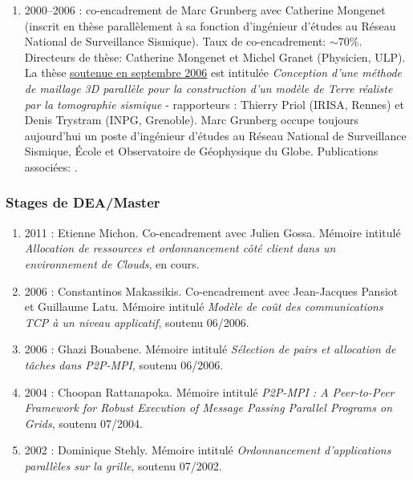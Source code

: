 \documentclass[11pt]{article}
\begin{document}
\begin{enumerate}
\item 2000--2006 : co-encadrement de Marc Grunberg avec Catherine Mongenet 
(inscrit en thèse parallèlement à sa fonction d'ingénieur d'études au Réseau 
National de Surveillance Sismique). Taux de co-encadrement: $\sim$70\%.
Directeurs de thèse: Catherine Mongenet et Michel Granet (Physicien, ULP).
La thèse \underline{soutenue en septembre 2006} est intitulée \textit{Conception 
d'une méthode de maillage 3D parallèle pour la construction d'un modèle de Terre 
réaliste par la tomographie sismique} - rapporteurs : Thierry Priol (IRISA, Rennes) 
et Denis Trystram (INPG, Grenoble).
Marc Grunberg occupe toujours aujourd'hui un poste d'ingénieur d'études au Réseau 
National de Surveillance Sismique, \'{E}cole et Observatoire de Géophysique du Globe.
Publications associées: 
\cite{icps-2002-20,icps-2003-111,icps-2003-113,
      icps-2004-107,icps-2004-124,icps-2005-146,icps-2007-184}.\\



\end{enumerate}

\subsubsection{Stages de DEA/Master}
\begin{enumerate}

\item 2011 : Etienne Michon. Co-encadrement avec Julien Gossa. Mémoire intitulé  \textit{Allocation de ressources et ordonnancement côté client dans un environnement de Clouds}, en cours.
\item 2006 : Constantinos Makassikis. Co-encadrement avec Jean-Jacques Pansiot et Guillaume Latu. Mémoire intitulé  \textit{Modèle de coût des communications TCP à un niveau applicatif}, soutenu 06/2006.
\item 2006 : Ghazi Bouabene. Mémoire intitulé  \textit{Sélection de pairs et allocation de tâches dans P2P-MPI}, soutenu 06/2006.
\item 2004 : Choopan Rattanapoka. Mémoire intitulé  \textit{P2P-MPI : A Peer-to-Peer Framework for Robust Execution of Message Passing Parallel Programs on Grids}, soutenu 07/2004.
\item 2002 : Dominique Stehly. Mémoire intitulé \textit{Ordonnancement d'applications parallèles sur la grille}, soutenu 07/2002.
\end{enumerate}
\end{document}
